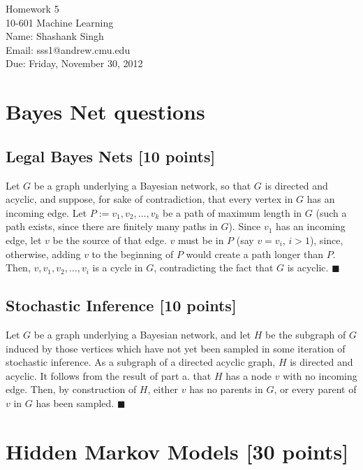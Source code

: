 \documentclass[11pt]{article}
\makeatletter
\newcommand{\myname}{Shashank Singh}
\newcommand{\myandrew}{sss1@andrew.cmu.edu}
\newcommand{\myclass}{10-601 Machine Learning}
\newcommand{\myhwnum}{5}
\newcommand{\duedate}{Friday, November 30, 2012}
\renewcommand{\qed}{\quad $\blacksquare$}
\makeatother
\begin{document}
\thispagestyle{plain}

{\Large Homework \myhwnum} \\
\myclass \\
Name: \myname \\
Email: \myandrew \\
Due: \duedate
\section{Bayes Net questions}
\subsection{Legal Bayes Nets [10 points]}
Let $G$ be a graph underlying a Bayesian network, so that $G$ is directed and
acyclic, and suppose, for sake of contradiction, that every vertex in $G$ has
an incoming edge. Let $P := v_1,v_2,\ldots,v_k$ be a path of maximum length in
$G$ (such a path exists, since there are finitely many paths in $G$). Since
$v_1$ has an incoming edge, let $v$ be the source of that edge. $v$ must be in
$P$ (say $v = v_i$, $i > 1$), since, otherwise, adding $v$ to the beginning of
$P$ would create a path longer than $P$. Then, $v,v_1,v_2,\ldots,v_i$ is a
cycle in $G$, contradicting the fact that $G$ is acyclic. \qed

\subsection{Stochastic Inference [10 points]}
Let $G$ be a graph underlying a Bayesian network, and let $H$ be the subgraph
of $G$ induced by those vertices which have not yet been sampled in some
iteration of stochastic inference. As a subgraph of a directed acyclic graph,
$H$ is directed and acyclic. It follows from the result of part a. that $H$
has a node $v$ with no incoming edge. Then, by construction of $H$, either $v$
has no parents in $G$, or every parent of $v$ in $G$ has been sampled. \qed

\section{Hidden Markov Models [30 points]}
\end{document}
